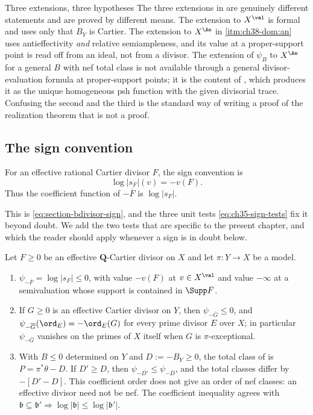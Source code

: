 \begin{warning}{Three extensions, three hypotheses}
\label{warn:ch38-three-extensions}
The three extensions in  are genuinely
different statements and are proved by different means.  The extension to
$X^{\val}$ is formal and uses only that $B_Y$ is Cartier.  The
extension to $X^{\An}$ in \cref{itm:ch38-dom:an} uses antieffectivity
\emph{and} relative semiampleness, and its value at a proper-support point
is read off from an ideal, not from a divisor.  The extension of
$\psi_B$ to $X^{\An}$ for a general $B$ with nef total class is not
available through a general divisor-evaluation formula at
proper-support points; it is the content of
, which produces it as the unique
homogeneous psh function with the given divisorial trace.  Confusing the
second and the third is the standard way of writing a proof of the
realization theorem that is not a proof.
\end{warning}

\subsection{The sign convention}
\label{sec:ch38-signs}

For an effective rational Cartier divisor $F$, the sign convention is
\[
                         \log|s_F|(v)=-v(F).
\tag{38.4}\label{eq:bj-divisor-weight-sign}
\]
Thus the coefficient function of $-\overline F$ is
$\log|s_F|$.

This is \eqref{eq:section-bdivisor-sign}, and the three unit tests
\eqref{eq:ch35-sign-tests} fix it beyond doubt.  We add the two tests that
are specific to the present chapter, and which the reader should apply
whenever a sign is in doubt below.

\begin{lemma}
\label{lem:ch38-sign-tests}
Let $F\geq0$ be an effective $\mathbf Q$-Cartier divisor on $X$ and
let $\pi:Y\to X$ be a model.
\begin{enumerate}
\item\label{itm:ch38-sign:pole}
 $\psi_{-\overline F}=\log|s_F|\leq0$, with value $-v(F)$ at
 $v\in X^{\val}$ and value $-\infty$ at a semivaluation whose support
 is contained in $\Supp F$.
\item\label{itm:ch38-sign:exceptional}
 If $G\geq0$ is an effective Cartier divisor on $Y$, then
 $\psi_{-\overline G}\leq0$, and
 $\psi_{-\overline G}(\ord_E)=-\ord_E(G)$ for every prime divisor $E$
 over $X$; in particular $\psi_{-\overline G}$ vanishes on the primes
 of $X$ itself when $G$ is $\pi$-exceptional.
\item\label{itm:ch38-sign:total}
 With $B\leq0$ determined on $Y$ and $D:=-B_Y\geq0$, the total class
 of  is $P=\pi^*\theta-D$.
 If $D'\geq D$, then $\psi_{-\overline{D'}}\leq\psi_{-\overline D}$,
 and the total classes differ by $-[D'-D]$. This coefficient order
 does not give an order of nef classes: an effective divisor need
 not be nef. The coefficient inequality agrees with
 $\mathfrak b\subseteq\mathfrak b'\Rightarrow\log|\mathfrak b|\leq
 \log|\mathfrak b'|$.
\end{enumerate}
\end{lemma}


